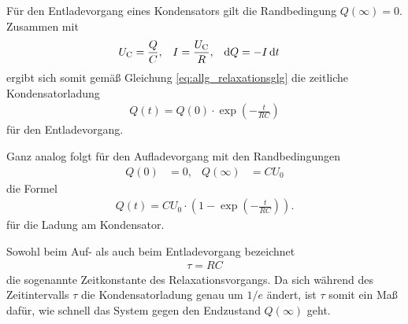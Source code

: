 \noindent
Für den Entladevorgang eines Kondensators gilt die Randbedingung $Q(\infty) = 0$.
Zusammen mit 
\begin{align*}
    U_\text{C} &= \frac{Q}{C}, & I &= \frac{U_\text{C}}{R}, & \mathop{}\!\mathrm{d}{Q} &= - I \mathop{}\!\mathrm{d}{t}
\end{align*}
ergibt sich somit gemäß Gleichung \eqref{eq:allg_relaxationsglg} die zeitliche Kondensatorladung
\begin{align}
    Q(t) = Q(0) \cdot \exp\left(- \frac{t}{RC}\right)
    \label{eq:entladung}
\end{align}
für den Entladevorgang.

\noindent
Ganz analog folgt für den Aufladevorgang mit den Randbedingungen
\begin{align*}
    Q(0) &= 0, & Q(\infty) &= C U_0 
\end{align*}
die Formel 
\begin{align}
    Q(t) = C U_0 \cdot \left(1-\exp\left(-\frac{t}{RC}\right)\right).
\end{align}
für die Ladung am Kondensator.

\noindent
Sowohl beim Auf- als auch beim Entladevorgang bezeichnet
\begin{align}
    \tau = R C
\end{align}
die sogenannte Zeitkonstante des Relaxationsvorgangs.
Da sich während des Zeitintervalls $\tau$ die Kondensatorladung genau um $1/e$ ändert,
ist $\tau$ somit ein Maß dafür, wie schnell das System gegen den Endzustand $Q(\infty)$ geht.